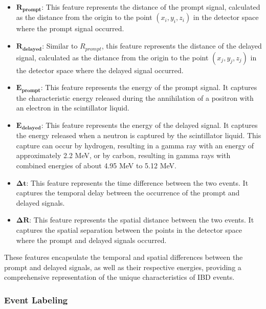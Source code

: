 \begin{itemize}
	 
	\item $\mathbf{R_{prompt}}$: This feature represents the distance of the prompt signal, calculated as the distance from the origin to the point $(x_i, y_i, z_i)$ in the detector space where the prompt signal occurred.	
	
	\item $\mathbf{R_{delayed}}$: Similar to $R_{prompt}$, this feature represents the distance of the delayed signal, calculated as the distance from the origin to the point $(x_j, y_j, z_j)$ in the detector space where the delayed signal occurred.

	\item $\mathbf{E_{prompt}}$: This feature represents the energy of the prompt signal. It captures the characteristic energy released during the annihilation of a positron with an electron in the scintillator liquid.

	\item $\mathbf{E_{delayed}}$: This feature represents the energy of the delayed signal. It captures the energy released when a neutron is captured by the scintillator liquid. This capture can occur by hydrogen, resulting in a gamma ray with an energy of approximately 2.2 MeV, or by carbon, resulting in gamma rays with combined energies of about 4.95 MeV to 5.12 MeV.

	\item $\mathbf{\Delta t}$: This feature represents the time difference between the two events. It captures the temporal delay between the occurrence of the prompt and delayed signals.

	\item $\mathbf{\Delta R}$: This feature represents the spatial distance between the two events. It captures the spatial separation between the points in the detector space where the prompt and delayed signals occurred.

\end{itemize}
These features encapsulate the temporal and spatial differences between the prompt and delayed signals, as well as their respective energies, providing a comprehensive representation of the unique characteristics of IBD events.


\subsubsection*{Event Labeling}

